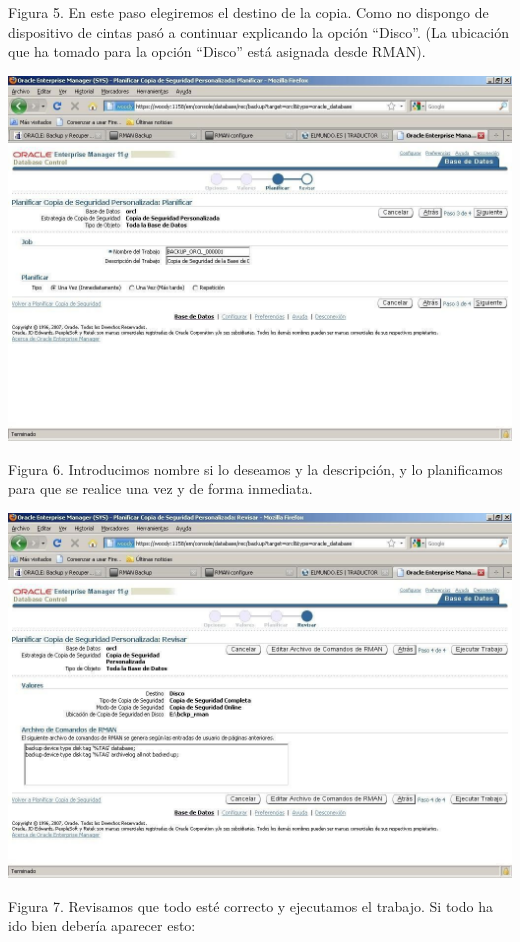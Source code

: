 \begin{enumerate}[1.]
\begin{center}
	\end{center}
	Figura 5. En este paso elegiremos el destino de la copia. Como no dispongo de dispositivo de cintas pasó a continuar explicando la opción “Disco”. (La ubicación que ha tomado para la opción “Disco” está asignada desde RMAN).
	\begin{center}
	\includegraphics[width=15cm]{./Imagenes/img-4-2-5}  
	\end{center}
	Figura 6. Introducimos nombre si lo deseamos y la descripción, y lo planificamos para que se realice una vez y de forma inmediata.
	\begin{center}
	\includegraphics[width=15cm]{./Imagenes/img-4-2-6}  
	\end{center}
	Figura 7. Revisamos que todo esté correcto y ejecutamos el trabajo. Si todo ha ido bien debería aparecer esto:

\end{enumerate}
